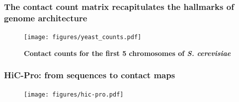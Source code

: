 \documentclass[xcolor=dvipsnames]{beamer}
\begin{document}
\begin{frame}
\frametitle{The contact count matrix recapitulates the hallmarks of genome
architecture}
\vspace{-1em}
\begin{figure}
\texttt{[image: figures/yeast\_counts.pdf]}
\caption{\textbf{Contact counts for the first 5 chromosomes of \textit{S.
cerevisiae}}}
\end{figure}
\end{frame}

\begin{frame}
\frametitle{HiC-Pro: from sequences to contact maps}
\begin{figure}
\begin{center}
\texttt{[image: figures/hic-pro.pdf]}
\end{center}
\end{figure}
\end{frame}
\end{document}
